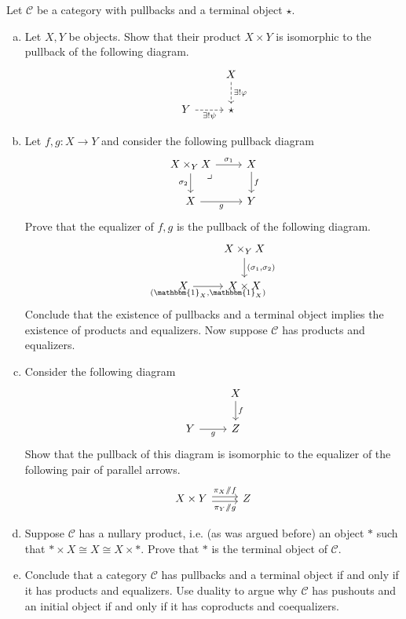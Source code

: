 \documentclass{amsart}
\theoremstyle{remark}
\theoremstyle{definition}
\theoremstyle{definition}
\newcommand{\Id}[1]{\mathbbm{1}_{#1}}
\def\then{\sslash}
\def\mcC{\mathcal{C}}
\begin{document}
Let $\mcC$ be a category with pullbacks and a terminal object $\star$. 
\begin{enumerate}[(a)]
    \item Let $X,Y$ be objects. Show that their product $X\times Y$ is isomorphic to the pullback of the following diagram.
    \[
    \begin{tikzcd}
     {} & X \arrow[d, dashed,"\exists!\varphi"]\\
     Y \arrow[r, dashed,"\exists!\psi"'] & \star 
    \end{tikzcd}
    \]
    
    \item Let $f,g:X\to Y$ and consider the following pullback diagram
    \[
    \begin{tikzcd}
     X\times_Y X \arrow[r,"\sigma_1"]\arrow[d,"\sigma_2"'] \arrow[dr, phantom, "\lrcorner", very near start]  & X \arrow[d,"f"] \\
     X \arrow[r,"g"'] & Y
    \end{tikzcd}
    \]
    Prove that the equalizer of $f,g$ is the pullback of the following diagram.
    \[
    \begin{tikzcd}
      {} & X\times_Y X \arrow[d,"{(\sigma_1,\sigma_2)}"] \\
      X \arrow[r,"{(\Id{X},\Id{X})}"'] & X\times X
    \end{tikzcd}
    \]
    Conclude that the existence of pullbacks and a terminal object implies the existence of products and equalizers. Now suppose $\mathcal{C}$ has products and equalizers.
    
    \item Consider the following diagram
    \[
    \begin{tikzcd}
     {} & X \arrow[d,"f"] \\
     Y \arrow[r,"g"'] & Z
    \end{tikzcd}
    \]
    Show that the pullback of this diagram is isomorphic to the equalizer of the following pair of parallel arrows.
    \[
    \begin{tikzcd}
    X\times Y\arrow[r,shift left = .5 ex,"\pi_X\then f"] \arrow[r, shift right = .5 ex, "\pi_Y\then g"'] & Z
    \end{tikzcd}
    \]
    \item Suppose $\mcC$ has a nullary product, i.e. (as was argued before) an object $*$ such that $*\times X\cong X\cong X\times *$. Prove that $*$ is the terminal object of $\mcC$.
    
    \item Conclude that a category $\mcC$ has pullbacks and a terminal object if and only if it has products and equalizers. Use duality to argue why $\mcC$ has pushouts and an initial object if and only if it has coproducts and coequalizers.
\end{enumerate}
\end{document}
